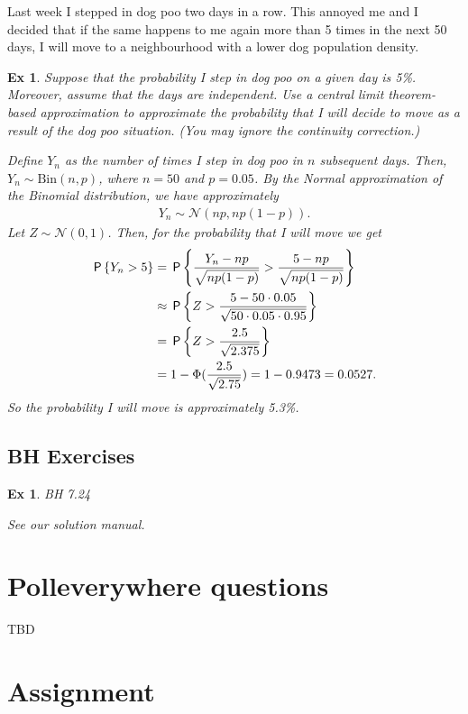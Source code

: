 \documentclass[a4paper,11pt]{article}
\newtheorem{exercise}[theorem]{Ex}
\begin{document}
Last week I stepped in dog poo two days in a row. This annoyed me and I decided that if the same happens to me again more than 5 times in the next 50 days, I will move to a neighbourhood with a lower dog population density.

\begin{exercise}
Suppose that the probability I step in dog poo on a given day is 5\%. Moreover, assume that the days are independent. Use a central limit theorem-based approximation to approximate the probability that I will decide to move as a result of the dog poo situation. (You may ignore the continuity correction.)
\begin{solution}
Define $Y_n$ as the number of times I step in dog poo in $n$ subsequent days. Then, $Y_n \sim \text{Bin}(n, p)$, where $n=50$ and $p = 0.05$. By the Normal approximation of the Binomial distribution, we have approximately
\begin{align}
    Y_n \sim \mathcal{N}(np, np(1-p)).
\end{align}
Let $Z \sim \mathcal{N}(0,1)$. Then, for the probability that I will move we get
\begin{align}
    \P{Y_n > 5} &= \P{\frac{Y_n - np}{\sqrt{np(1-p)}} > \frac{5 - np}{\sqrt{np(1-p)}} } \\
    &\approx \P{Z > \frac{5 - 50\cdot 0.05}{\sqrt{50 \cdot 0.05 \cdot 0.95}} } \\
    &= \P{Z > \frac{2.5}{\sqrt{2.375}} } \\
    &= 1 - \Phi(\frac{2.5}{\sqrt{2.75}}) =  1 - 0.9473 = 0.0527.
\end{align}
So the probability I will move is approximately 5.3\%.
\end{solution}
\end{exercise}


\subsection{BH Exercises}
\label{sec:bh-exercises-1}


\begin{exercise}
BH 7.24
\begin{solution}
See our solution manual.
\end{solution}
\end{exercise}



\section{Polleverywhere questions}
\label{sec:polev-quest}


TBD


\section{Assignment}
\label{sec:assignment}

%

\end{document}
